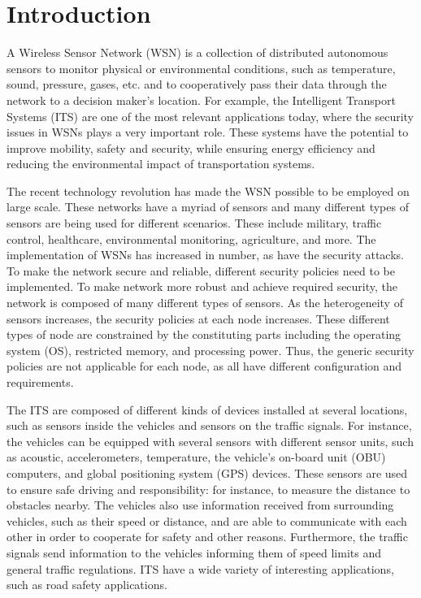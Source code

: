 \documentclass[12pt,a4paper,twoside]{report}
\begin{document}
\section{Introduction}
A Wireless Sensor Network (WSN) is a collection of distributed autonomous sensors to monitor physical or environmental conditions, such as temperature, sound, pressure, gases, etc. and to cooperatively pass their data through the network to a decision maker's location. For example, the Intelligent Transport Systems (ITS) are one of the most relevant applications today, where the security issues in WSNs plays a very important role. These systems have the potential to improve mobility, safety and security, while ensuring energy efficiency and reducing the environmental impact of transportation systems. \par
The recent technology revolution has made the WSN possible to be employed on large scale. These networks have a myriad of sensors and many different types of sensors are being used for different scenarios. These include military, traffic control, healthcare, environmental monitoring, agriculture, and more. The implementation of WSNs has increased in number, as have the security attacks. To make the network secure and reliable, different security policies need to be implemented. To make network more robust and achieve required security, the network is composed of many different types of sensors. As the heterogeneity of sensors increases, the security policies at each node increases. These different types of node are constrained by the constituting parts including the operating system (OS), restricted memory, and processing power. Thus, the generic security policies are not applicable for each node, as all have different configuration and requirements.\par
The ITS are composed of different kinds of devices installed at several locations, such as sensors inside the vehicles and sensors on the traffic signals. For instance, the vehicles can be equipped with several sensors with different sensor units, such as acoustic, accelerometers, temperature, the vehicle's on-board unit (OBU) computers, and global positioning system (GPS) devices. These sensors are used to ensure safe driving and responsibility: for instance, to measure the distance to obstacles nearby. The vehicles also use information received from surrounding vehicles, such as their speed or distance, and are able to communicate with each other in order to cooperate for safety and other reasons. Furthermore, the traffic signals send information to the vehicles informing them of speed limits and general traffic regulations. ITS have a wide variety of interesting applications, such as road safety applications.\par
\end{document}

